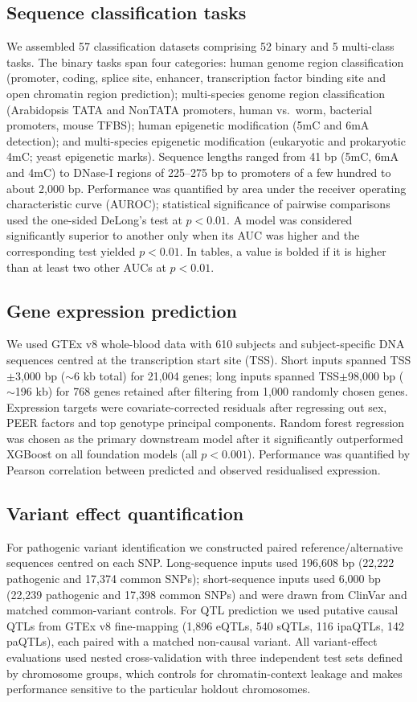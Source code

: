 \documentclass[11pt,a4paper]{article}
\begin{document}
\subsection{Sequence classification tasks}
We assembled 57 classification datasets comprising 52 binary and 5 multi-class tasks. The binary tasks span four categories: human genome region classification (promoter, coding, splice site, enhancer, transcription factor binding site and open chromatin region prediction); multi-species genome region classification (Arabidopsis TATA and NonTATA promoters, human vs.\ worm, bacterial promoters, mouse TFBS); human epigenetic modification (5mC and 6mA detection); and multi-species epigenetic modification (eukaryotic and prokaryotic 4mC; yeast epigenetic marks). Sequence lengths ranged from 41 bp (5mC, 6mA and 4mC) to DNase-I regions of 225--275 bp to promoters of a few hundred to about 2{,}000 bp. Performance was quantified by area under the receiver operating characteristic curve (AUROC); statistical significance of pairwise comparisons used the one-sided DeLong's test \citep{delong1988comparing} at $p < 0.01$. A model was considered significantly superior to another only when its AUC was higher and the corresponding test yielded $p < 0.01$. In tables, a value is bolded if it is higher than at least two other AUCs at $p < 0.01$.

\subsection{Gene expression prediction}
We used GTEx v8 whole-blood data with 610 subjects and subject-specific DNA sequences centred at the transcription start site (TSS). Short inputs spanned TSS$\pm$3{,}000 bp ($\sim$6 kb total) for 21{,}004 genes; long inputs spanned TSS$\pm$98{,}000 bp ($\sim$196 kb) for 768 genes retained after filtering from 1{,}000 randomly chosen genes. Expression targets were covariate-corrected residuals after regressing out sex, PEER factors and top genotype principal components. Random forest regression was chosen as the primary downstream model after it significantly outperformed XGBoost \citep{chen2016xgboost} on all foundation models (all $p < 0.001$). Performance was quantified by Pearson correlation between predicted and observed residualised expression.

\subsection{Variant effect quantification}
For pathogenic variant identification we constructed paired reference/alternative sequences centred on each SNP. Long-sequence inputs used 196{,}608 bp (22{,}222 pathogenic and 17{,}374 common SNPs); short-sequence inputs used 6{,}000 bp (22{,}239 pathogenic and 17{,}398 common SNPs) and were drawn from ClinVar and matched common-variant controls. For QTL prediction we used putative causal QTLs from GTEx v8 fine-mapping (1{,}896 eQTLs, 540 sQTLs, 116 ipaQTLs, 142 paQTLs), each paired with a matched non-causal variant. All variant-effect evaluations used nested cross-validation with three independent test sets defined by chromosome groups, which controls for chromatin-context leakage and makes performance sensitive to the particular holdout chromosomes.
\end{document}
